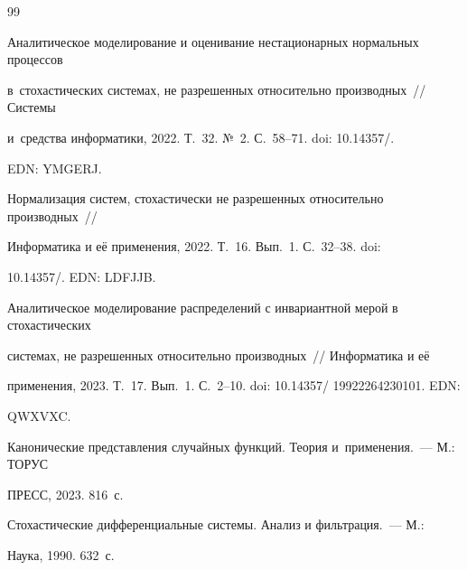 {{\begin{thebibliography}{99}



Аналитическое моделирование и оценивание нестационарных нормальных процессов 

в~стохастических сис\-те\-мах, не разрешенных относительно производных~/\!\!/ Сис\-те\-мы 

и~средства информатики, 2022. Т.~32. №~2. С.~58--71. doi: 10.14357\!/. 

EDN: YMGERJ.






Нормализация систем, стохастически не разрешенных относительно производных~/\!\!/ 

Информатика и её применения, 2022. Т.~16. Вып.~1. С.~32--38. doi: 

10.14357\!/. EDN: LDFJJB.






Аналитическое моделирование распределений с инвариантной мерой в стохастических 

системах, не разрешенных относительно производных~/\!\!/ Информатика и её 

применения, 2023. Т.~17. Вып.~1. С.~2--10. doi: 10.14357\!/ 19922264230101. EDN: 

QWXVXC.








Канонические представления случайных функций. Теория и~применения.~--- М.: ТОРУС 

ПРЕСС, 2023. 816~с.






Стохастические дифференциальные системы. Анализ и фильтрация.~--- М.:

Наука,  1990.  632~с. %



\end{thebibliography}}}
